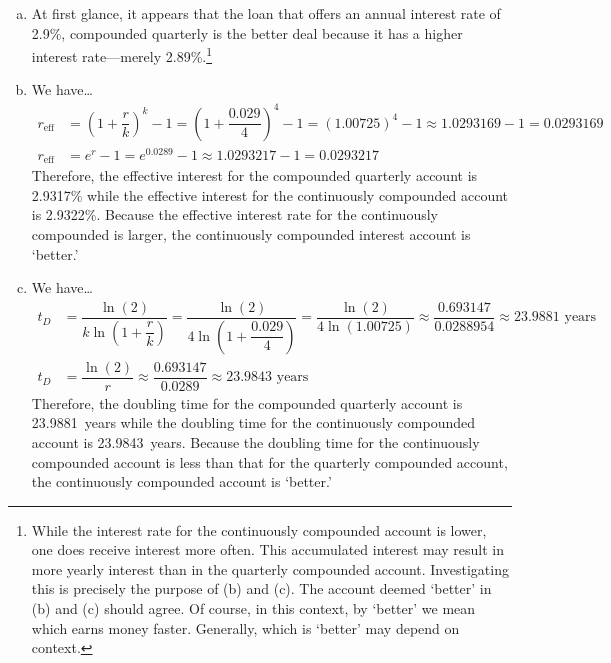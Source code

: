 \documentclass[11pt,letterpaper]{article}
\begin{document}
\sol 
\begin{enumerate}[(a)]
\item At first glance, it appears that the loan that offers an annual interest rate of 2.9\%, compounded quarterly is the better deal because it has a higher interest rate---merely 2.89\%.\footnote{While the interest rate for the continuously compounded account is lower, one does receive interest more often. This accumulated interest may result in more yearly interest than in the quarterly compounded account. Investigating this is precisely the purpose of (b) and (c). The account deemed `better' in (b) and (c) should agree. Of course, in this context, by `better' we mean which earns money faster. Generally, which is `better' may depend on context.} \pspace

\item We have\dots
	\[
	\begin{aligned}
	r_{\text{eff}}&= \left(1 + \dfrac{r}{k} \right)^k - 1=  \left(1 + \dfrac{0.029}{4} \right)^4 - 1= (1.00725)^4 - 1 \approx 1.0293169 - 1= 0.0293169 \\
	r_{\text{eff}}&= e^r - 1= e^{0.0289} - 1 \approx 1.0293217 - 1= 0.0293217
	\end{aligned}
	\]
Therefore, the effective interest for the compounded quarterly account is 2.9317\% while the effective interest for the continuously compounded account is 2.9322\%. Because the effective interest rate for the continuously compounded is larger, the continuously compounded interest account is `better.' \pspace

\item We have\dots
	\[
	\begin{aligned}
	t_D&= \dfrac{\ln(2)}{k \ln \left(1 + \dfrac{r}{k} \right)}= \dfrac{\ln(2)}{4 \ln \left(1 + \dfrac{0.029}{4} \right)}= \dfrac{\ln(2)}{4 \ln(1.00725)} \approx \dfrac{0.693147}{0.0288954} \approx 23.9881 \text{ years} \\
	t_D&= \dfrac{\ln(2)}{r} \approx \dfrac{0.693147}{0.0289} \approx 23.9843 \text{ years}
	\end{aligned}
	\]
Therefore, the doubling time for the compounded quarterly account is 23.9881~years while the doubling time for the continuously compounded account is 23.9843~years. Because the doubling time for the continuously compounded account is less than that for the quarterly compounded account, the continuously compounded account is `better.' 
\end{enumerate}
\end{document}
